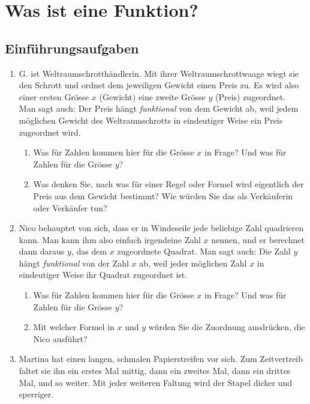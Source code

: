\section{Was ist eine Funktion?}
\subsection{Einführungsaufgaben}
\begin{enumerate}
    \item G. ist Weltraumschrotthändlerin. Mit ihrer Weltraumschrottwaage wiegt sie den Schrott und ordnet dem jeweiligen Gewicht einen Preis zu. Es wird also einer ersten Grösse $x$ (Gewicht) eine zweite Grösse $y$ (Preis) zugeordnet. \\
          Man sagt auch: Der Preis hängt \emph{funktional} von dem Gewicht ab, weil jedem möglichen Gewicht des Weltraumschrotts in eindeutiger Weise ein Preis zugeordnet wird.
          \begin{enumerate}
              \item Was für Zahlen kommen hier für die Grösse $x$ in Frage? Und was für Zahlen für die Grösse $y$?
              \item Was denken Sie, nach was für einer Regel oder Formel wird eigentlich der Preis aus dem Gewicht bestimmt? Wie würden Sie das als Verkäuferin oder Verkäufer tun?
          \end{enumerate}
    \item Nico behauptet von sich, dass er in Windeseile jede beliebige Zahl quadrieren kann.
          Man kann ihm also einfach irgendeine Zahl $x$ nennen, und er berechnet dann daraus
          $y$, das dem $x$ zugeordnete Quadrat. Man sagt auch: Die Zahl $y$ hängt
          \emph{funktional} von der Zahl $x$ ab, weil jeder möglichen Zahl $x$ in eindeutiger
          Weise ihr Quadrat zugeordnet ist.

          \begin{enumerate}
              \item Was für Zahlen kommen hier für die Grösse $x$ in Frage? Und was für Zahlen
                    für die Grösse $y$?
              \item Mit welcher Formel in $x$ und $y$ würden Sie die Zuordnung ausdrücken,
                    die Nico ausführt?
          \end{enumerate}
    \item Martina hat einen langen, schmalen Papierstreifen vor sich. Zum Zeitvertreib faltet sie ihn ein erstes Mal mittig, dann ein zweites Mal, dann ein drittes Mal, und so weiter. Mit jeder weiteren Faltung wird der Stapel dicker und sperriger.


\end{enumerate}
